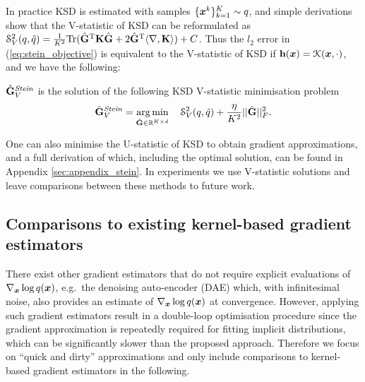 In practice KSD is estimated with samples $\{ \bm{x}^k \}_{k=1}^K \sim q$, and simple derivations show that the V-statistic of KSD can be reformulated as $\mathcal{S}_{V}^2(q, \hat{q}) = \frac{1}{K^2} \text{Tr} (\hat{\mathbf{G}}^{\text{T}} \mathbf{K} \hat{\mathbf{G}} + 2 \hat{\mathbf{G}}^{\text{T}} \langle \nabla, \mathbf{K} \rangle) + C$.
%
Thus the $l_2$ error in (\ref{eq:stein_objective}) is equivalent to the V-statistic of KSD if $\mathbf{h}(\bm{x}) = \mathcal{K}(\bm{x}, \cdot)$, and we have the following:
\begin{theorem}
$\hat{\mathbf{G}}_V^{\text{\emph{Stein}}}$ is the solution of the following KSD V-statistic minimisation problem
\begin{equation}
\hat{\mathbf{G}}_V^{\text{\emph{Stein}}} = \operatorname*{arg\,min}_{\hat{\mathbf{G}} \in \mathbb{R}^{K \times d}} \quad \mathcal{S}_{V}^2(q, \hat{q}) + \frac{\eta}{ K^2} ||\hat{\mathbf{G}}||_F^2 .
\end{equation}
\label{thm:stein_ksd}
\vspace{-0.2in}
\end{theorem}
%
One can also minimise the U-statistic of KSD to obtain gradient approximations, and a full derivation of which, including the optimal solution, can be found in Appendix \ref{sec:appendix_stein}. In experiments we use V-statistic solutions and leave comparisons between these methods to future work.

\subsection{Comparisons to existing kernel-based gradient estimators}
There exist other gradient estimators that do not require explicit evaluations of $\nabla_{\bm{x}} \log q(\bm{x})$, e.g.~the denoising auto-encoder (DAE) \citep{vincent:denoising2008, vincent:denoising2011, alain:denoising2014} which, with infinitesimal noise, also provides an estimate of $\nabla_{\bm{x}} \log q(\bm{x})$ at convergence. However, applying such gradient estimators result in a double-loop optimisation procedure since the gradient approximation is repeatedly required for fitting implicit distributions, which can be significantly slower than the proposed approach. Therefore we focus on ``quick and dirty'' approximations and only include comparisons to kernel-based gradient estimators in the following.

